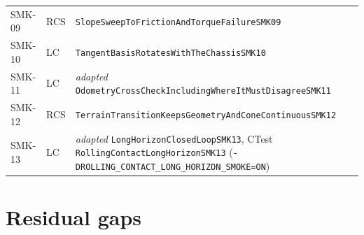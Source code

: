 \documentclass[10pt]{article}
\begin{document}
{\begin{longtable}{|l|l|p{}|}
  SMK-09 & RCS & \texttt{SlopeSweepToFrictionAndTorqueFailureSMK09} \\
  SMK-10 & LC & \texttt{TangentBasisRotatesWithTheChassisSMK10} \\
  SMK-11 & LC & \emph{adapted} \texttt{OdometryCrossCheckIncludingWhereItMustDisagreeSMK11} \\
  SMK-12 & RCS & \texttt{TerrainTransitionKeepsGeometryAndConeContinuousSMK12} \\
  SMK-13 & LC & \emph{adapted} \texttt{LongHorizonClosedLoopSMK13},
    CTest \texttt{RollingContactLongHorizonSMK13}
    (\texttt{-DROLLING\_CONTACT\_LONG\_HORIZON\_SMOKE=ON}) \\
  \hline
\end{longtable}
}

\section{Residual gaps}
\label{sec:test-gaps}
\end{document}
